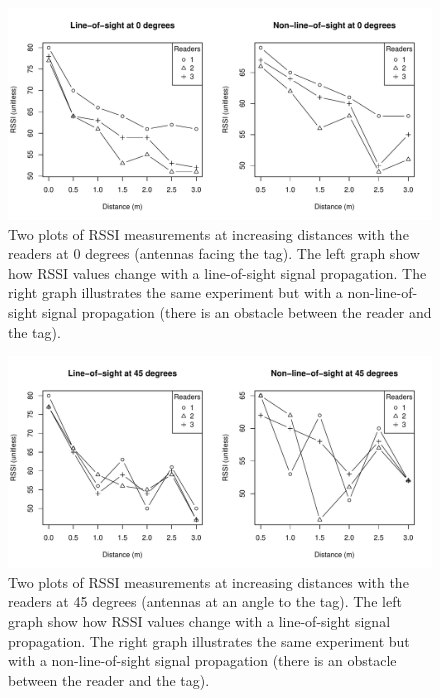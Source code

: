 \documentclass[a4paper,12pt]{article}
\begin{document}
\begin{figure}
	\begin{center}
		\includegraphics[width=1\textwidth]{rssi_distance_3m_0deg}
		\caption{Two plots of RSSI measurements at increasing distances with the readers at 0 degrees (antennas facing the tag). The left graph show how RSSI values change with a line-of-sight signal propagation. The right graph illustrates the same experiment but with a non-line-of-sight signal propagation (there is an obstacle between the reader and the tag).}
	\end{center}
\end{figure}
\begin{figure}
	\begin{center}
		\includegraphics[width=1\textwidth]{rssi_distance_3m_45deg}
		\caption{Two plots of RSSI measurements at increasing distances with the readers at 45 degrees (antennas at an angle to the tag). The left graph show how RSSI values change with a line-of-sight signal propagation. The right graph illustrates the same experiment but with a non-line-of-sight signal propagation (there is an obstacle between the reader and the tag).}
	\end{center}
\end{figure}
\end{document}
